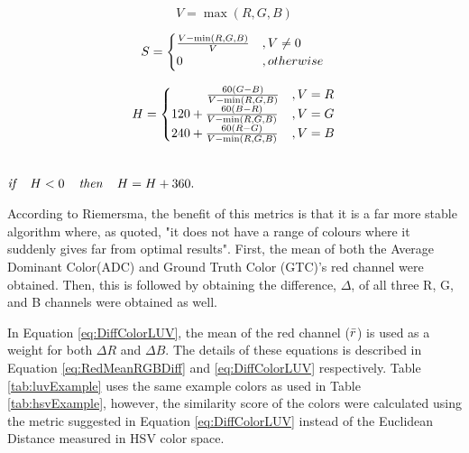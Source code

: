 \begin{equation}
\label{eq:RGBHSVconversion1}
V = \max(R,G,B) 
\end{equation}

\begin{equation}
\label{eq:RGBHSVconversion2}
S = \begin{cases}\frac{V - \min(R,G,B)}{V} & , V \neq 0\\ 
0 & , otherwise \end{cases} \\
\end{equation}

\begin{equation}
\label{eq:RGBHSVconversion3}
H = \begin{cases}
\hspace{2.8em} \frac{60(G-B)}{V-\min(R,G,B)} & ,V = R\\
120 + \frac{60(B-R)}{V-\min(R,G,B)} & ,V = G\\
240 + \frac{60(R-G)}{V-\min(R,G,B)} & ,V = B 
\end{cases}
\end{equation}

\centerline{\\$\textit{if } \hspace{.8em}H< 0 \hspace{.8em}\textit{ then } \hspace{.8em}H = H+360.$}











According to Riemersma, the benefit of this metrics is that it is a far more stable algorithm where, as quoted, "it does not have a range of colours where it suddenly gives far from optimal results". First, the mean of both the Average Dominant Color(ADC) and Ground Truth Color (GTC)'s red channel were obtained. Then, this is followed by obtaining the difference, $\Delta$, of all three R, G, and B channels were obtained as well. 

In Equation \ref{eq:DiffColorLUV}, the mean of the red channel ($\bar{r}$) is used as a weight for both $\Delta{R}$ and $\Delta{B}$. The details of these equations is described in Equation \ref{eq:RedMeanRGBDiff} and \ref{eq:DiffColorLUV} respectively. Table \ref{tab:luvExample} uses the same example colors as used in Table \ref{tab:hsvExample}, however, the similarity score of the colors were calculated using the metric suggested in Equation \ref{eq:DiffColorLUV} instead of the Euclidean Distance measured in HSV color space.


